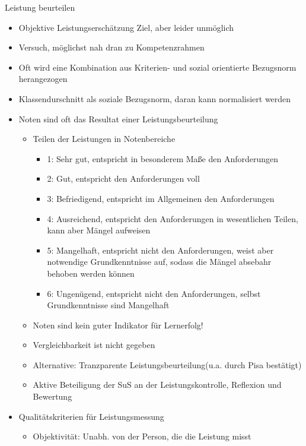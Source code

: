 \documentclass{article}
\begin{document}
\begin{block}{Leistung beurteilen}
    \begin{itemize}
        \item Objektive Leistungserschätzung Ziel, aber leider unmöglich
        \item Versuch, möglichst nah dran zu Kompetenzrahmen
        \item Oft wird eine Kombination aus Kriterien- und sozial orientierte Bezugsnorm herangezogen
        \item Klassendurschnitt als soziale Bezugsnorm, daran kann normalisiert werden
        \item Noten sind oft das Resultat einer Leistungsbeurteilung
        \begin{itemize}
            \item Teilen der Leistungen in Notenbereiche
            \begin{itemize}
                \item 1: Sehr gut, entspricht in besonderem Maße den Anforderungen
                \item 2: Gut, entspricht den Anforderungen voll
                \item 3: Befriedigend, entspricht im Allgemeinen den Anforderungen
                \item 4: Ausreichend, entspricht den Anforderungen in wesentlichen Teilen, kann aber Mängel aufweisen
                \item 5: Mangelhaft, entspricht nicht den Anforderungen, weist aber notwendige Grundkenntnisse auf, sodass die Mängel absebahr behoben werden können
                \item 6: Ungenügend, entspricht nicht den Anforderungen, selbst Grundkenntnisse sind Mangelhaft
            \end{itemize}
            \item Noten sind kein guter Indikator für Lernerfolg!
            \item Vergleichbarkeit ist nicht gegeben
            \item Alternative: Tranzparente Leistungsbeurteilung(u.a. durch Pisa bestätigt)
            \item Aktive Beteiligung der SuS an der Leistungskontrolle, Reflexion und Bewertung
        \end{itemize}
        \item Qualitätskriterien für Leistungsmessung
        \begin{itemize}
            \item Objektivität: Unabh. von der Person, die die Leistung misst

\end{itemize}
\end{itemize}
\end{block}
\end{document}
